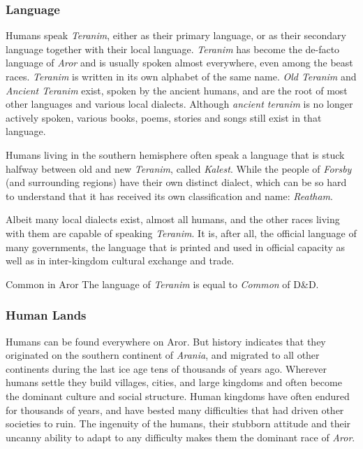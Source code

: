 \subsubsection*{Language}

Humans speak \emph{Teranim}, either as their primary language, or as their
secondary language together with their local language. \emph{Teranim} has
become the de-facto language of \emph{Aror} and is usually spoken almost
everywhere, even among the beast races. \emph{Teranim} is written in its own
alphabet of the same name. \emph{Old Teranim} and \emph{Ancient Teranim} exist,
spoken by the ancient humans, and are the root of most other languages and
various local dialects. Although \emph{ancient teranim} is no longer actively
spoken, various books, poems, stories and songs still exist in that language.

Humans living in the southern hemisphere often speak a language that is
stuck halfway between old and new \emph{Teranim}, called \emph{Kalest}. While
the people of \emph{Forsby} (and surrounding regions) have their own distinct
dialect, which can be so hard to understand that it has received its own
classification and name: \emph{Reatham}.

Albeit many local dialects exist, almost all humans, and the other races
living with them are capable of speaking \emph{Teranim}. It is, after all,
the official language of many governments, the language that is printed and
used in official capacity as well as in inter-kingdom cultural exchange and
trade.

\begin{35e}{Common in Aror}
The language of \emph{Teranim} is equal to \emph{Common} of D\&D.
\end{35e}

\subsubsection*{Human Lands}

Humans can be found everywhere on Aror. But history indicates that they
originated on the southern continent of \emph{Arania}, and migrated to all
other continents during the last ice age tens of thousands of years
ago. Wherever humans settle they build villages, cities, and large kingdoms
and often become the dominant culture and social structure. Human kingdoms
have often endured for thousands of years, and have bested many difficulties
that had driven other societies to ruin. The ingenuity of the humans, their
stubborn attitude and their uncanny ability to adapt to any difficulty makes
them the dominant race of \emph{Aror}.

